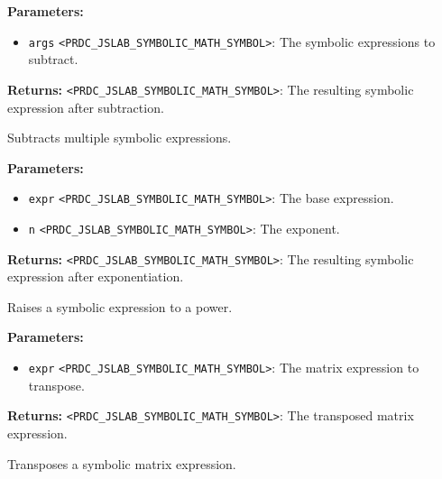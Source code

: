 \documentclass[12pt,a4paper]{article}
\begin{document}
\noindent \textbf{Parameters:}
\begin{itemize}
  \item \texttt{args} \texttt{<PRDC\_JSLAB\_SYMBOLIC\_MATH\_SYMBOL>}: The symbolic expressions to subtract.
\end{itemize}

\noindent \textbf{Returns:} \texttt{<PRDC\_JSLAB\_SYMBOLIC\_MATH\_SYMBOL>}: The resulting symbolic expression after subtraction.

\noindent Subtracts multiple symbolic expressions.

\vspace{5mm}
\noindent {}


\noindent \textbf{Parameters:}
\begin{itemize}
  \item \texttt{expr} \texttt{<PRDC\_JSLAB\_SYMBOLIC\_MATH\_SYMBOL>}: The base expression.
  \item \texttt{n} \texttt{<PRDC\_JSLAB\_SYMBOLIC\_MATH\_SYMBOL>}: The exponent.
\end{itemize}

\noindent \textbf{Returns:} \texttt{<PRDC\_JSLAB\_SYMBOLIC\_MATH\_SYMBOL>}: The resulting symbolic expression after exponentiation.

\noindent Raises a symbolic expression to a power.

\vspace{5mm}
\noindent {}


\noindent \textbf{Parameters:}
\begin{itemize}
  \item \texttt{expr} \texttt{<PRDC\_JSLAB\_SYMBOLIC\_MATH\_SYMBOL>}: The matrix expression to transpose.
\end{itemize}

\noindent \textbf{Returns:} \texttt{<PRDC\_JSLAB\_SYMBOLIC\_MATH\_SYMBOL>}: The transposed matrix expression.

\noindent Transposes a symbolic matrix expression.

\vspace{5mm}
\noindent {}
\end{document}
